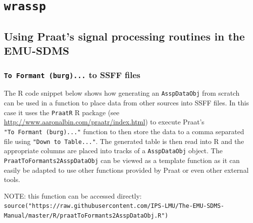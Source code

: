 \documentclass[]{book}
\begin{document}
\hypertarget{app-chap:wrassp}{%
\chapter{\texorpdfstring{\texttt{wrassp}}{wrassp}}\label{app-chap:wrassp}}

\hypertarget{sec:app-chap-wrassp-praatsSigProc}{%
\section{Using Praat's signal processing routines in the EMU-SDMS}\label{sec:app-chap-wrassp-praatsSigProc}}

\hypertarget{to-formant-burg...-to-ssff-files}{%
\subsection{\texorpdfstring{\texttt{To\ Formant\ (burg)...} to SSFF files}{To Formant (burg)... to SSFF files}}\label{to-formant-burg...-to-ssff-files}}

The R code snippet below shows how generating an \texttt{AsspDataObj} from scratch can be used in a function to place data from other sources into SSFF files. In this case it uses the \texttt{PraatR} R package (see \url{http://www.aaronalbin.com/praatr/index.html}) to execute Praat's \texttt{"To\ Formant\ (burg)..."} function to then store the data to a comma separated file using \texttt{"Down\ to\ Table..."}. The generated table is then read into R and the appropriate columns are placed into tracks of a \texttt{AsspDataObj} object. The \texttt{PraatToFormants2AsspDataObj} can be viewed as a template function as it can easily be adapted to use other functions provided by Praat or even other external tools.

NOTE: this function can be accessed directly: \texttt{source("https://raw.githubusercontent.com/IPS-LMU/The-EMU-SDMS-Manual/master/R/praatToFormants2AsspDataObj.R")}
\end{document}
